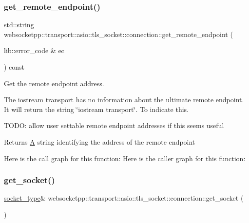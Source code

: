 \subsubsection{\texorpdfstring{get\+\_\+remote\+\_\+endpoint()}{get\_remote\_endpoint()}}
{\footnotesize\ttfamily std\+::string websocketpp\+::transport\+::asio\+::tls\+\_\+socket\+::connection\+::get\+\_\+remote\+\_\+endpoint (\begin{DoxyParamCaption}\item[{lib\+::error\+\_\+code \&}]{ec }\end{DoxyParamCaption}) const\hspace{0.3cm}{\ttfamily [inline]}}



Get the remote endpoint address. 

The iostream transport has no information about the ultimate remote endpoint. It will return the string \char`\"{}iostream transport\char`\"{}. To indicate this.

T\+O\+DO\+: allow user settable remote endpoint addresses if this seems useful

\begin{DoxyReturn}{Returns}
\mbox{\hyperlink{struct_a}{A}} string identifying the address of the remote endpoint 
\end{DoxyReturn}
Here is the call graph for this function\+:
Here is the caller graph for this function\+:
\mbox{\label{classwebsocketpp_1_1transport_1_1asio_1_1tls__socket_1_1connection_af86b843634236dee59431078a23b3527}} 
\subsubsection{\texorpdfstring{get\+\_\+socket()}{get\_socket()}}
{\footnotesize\ttfamily \mbox{\hyperlink{classwebsocketpp_1_1transport_1_1asio_1_1tls__socket_1_1connection_a99c358b4afc58ee1b1b60cf32fcf5c87}{socket\+\_\+type}}\& websocketpp\+::transport\+::asio\+::tls\+\_\+socket\+::connection\+::get\+\_\+socket (\begin{DoxyParamCaption}{ }\end{DoxyParamCaption})\hspace{0.3cm}{\ttfamily [inline]}}




